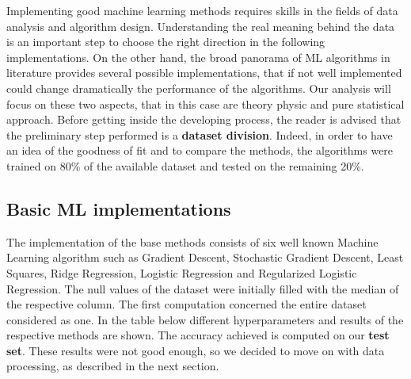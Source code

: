\documentclass[10pt,article]{IEEEtran}
\begin{document}
Implementing good machine learning methods requires skills in the fields of data analysis and algorithm design. Understanding the real meaning behind the data is an important step to choose the right direction in the following implementations. On the other hand, the broad panorama of ML algorithms in literature provides several possible implementations, that if not well implemented could change dramatically the performance of the algorithms. Our analysis will focus on these two aspects, that in this case are theory physic and pure statistical approach.
Before getting inside the developing process, the reader is advised that the preliminary step performed is a \textbf{dataset division}. Indeed, in order to have an idea of the  goodness of fit and to compare the methods, the algorithms were trained on 80\% of the available dataset and tested on the remaining 20\%.

\subsection{Basic ML implementations}
\label{subsec:model-impl}
The implementation of the base methods consists of six well known Machine Learning algorithm such as Gradient Descent, Stochastic Gradient Descent, Least Squares, Ridge Regression, Logistic Regression and Regularized Logistic Regression. The null values of the dataset were initially filled with the median of the respective column. The first computation concerned the entire dataset considered as one. In the table below different hyperparameters and results of the respective methods are shown. The accuracy achieved is computed on our \textbf{ test set}. These results were not good enough, so we decided to move on with data processing, as described in the next section.
\end{document}
